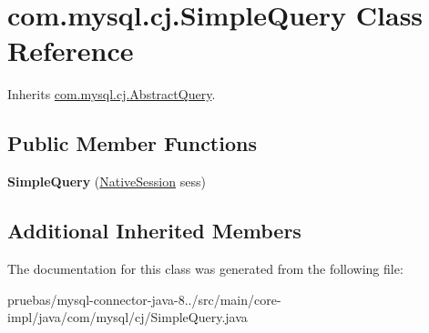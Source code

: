 \hypertarget{classcom_1_1mysql_1_1cj_1_1_simple_query}{}\section{com.\+mysql.\+cj.\+Simple\+Query Class Reference}
\label{classcom_1_1mysql_1_1cj_1_1_simple_query}


Inherits \mbox{\hyperlink{classcom_1_1mysql_1_1cj_1_1_abstract_query}{com.\+mysql.\+cj.\+Abstract\+Query}}.

\subsection*{Public Member Functions}
\begin{DoxyCompactItemize}
\item 
\mbox{\label{classcom_1_1mysql_1_1cj_1_1_simple_query_a29fa70f647a733acfe90348e063e2e56}} 
{\bfseries Simple\+Query} (\mbox{\hyperlink{classcom_1_1mysql_1_1cj_1_1_native_session}{Native\+Session}} sess)
\end{DoxyCompactItemize}
\subsection*{Additional Inherited Members}


The documentation for this class was generated from the following file\+:\begin{DoxyCompactItemize}
\item 
pruebas/mysql-\/connector-\/java-\/8../src/main/core-\/impl/java/com/mysql/cj/Simple\+Query.\+java\end{DoxyCompactItemize}
